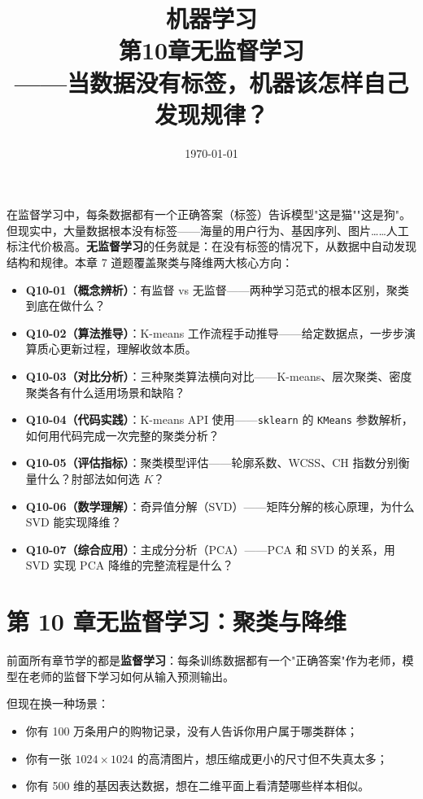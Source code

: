 \documentclass[a4paper,11pt]{ctexart}
\title{\textbf{机器学习\\第10章\quad 无监督学习}\\[0.5em]
{\large\color{gray}——当数据没有标签，机器该怎样自己发现规律？}}
\date{\today}
\begin{document}
\maketitle

\begin{beginnerbox}
    在监督学习中，每条数据都有一个正确答案（标签）告诉模型"这是猫""这是狗"。但现实中，大量数据根本没有标签——海量的用户行为、基因序列、图片……人工标注代价极高。\textbf{无监督学习}的任务就是：在没有标签的情况下，从数据中自动发现结构和规律。本章 7 道题覆盖聚类与降维两大核心方向：

    \begin{itemize}
        \item \textbf{Q10-01（概念辨析）}：有监督 vs 无监督——两种学习范式的根本区别，聚类到底在做什么？
        \item \textbf{Q10-02（算法推导）}：K-means 工作流程手动推导——给定数据点，一步步演算质心更新过程，理解收敛本质。
        \item \textbf{Q10-03（对比分析）}：三种聚类算法横向对比——K-means、层次聚类、密度聚类各有什么适用场景和缺陷？
        \item \textbf{Q10-04（代码实践）}：K-means API 使用——\texttt{sklearn} 的 \texttt{KMeans} 参数解析，如何用代码完成一次完整的聚类分析？
        \item \textbf{Q10-05（评估指标）}：聚类模型评估——轮廓系数、WCSS、CH 指数分别衡量什么？肘部法如何选 $K$？
        \item \textbf{Q10-06（数学理解）}：奇异值分解（SVD）——矩阵分解的核心原理，为什么 SVD 能实现降维？
        \item \textbf{Q10-07（综合应用）}：主成分分析（PCA）——PCA 和 SVD 的关系，用 SVD 实现 PCA 降维的完整流程是什么？
    \end{itemize}
\end{beginnerbox}

\section{第 10 章\quad 无监督学习：聚类与降维}

前面所有章节学的都是\textbf{监督学习}：每条训练数据都有一个"正确答案"作为老师，模型在老师的监督下学习如何从输入预测输出。

但现在换一种场景：

\begin{itemize}
    \item 你有 100 万条用户的购物记录，没有人告诉你用户属于哪类群体；
    \item 你有一张 $1024 \times 1024$ 的高清图片，想压缩成更小的尺寸但不失真太多；
    \item 你有 500 维的基因表达数据，想在二维平面上看清楚哪些样本相似。
\end{itemize}
\end{document}
